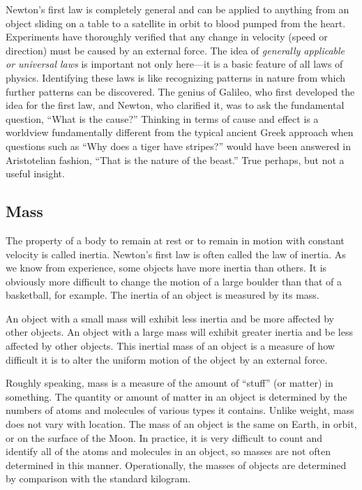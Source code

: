 \documentclass[
]{book}
\begin{document}
Newton's first law is completely general and can be applied to anything
from an object sliding on a table to a satellite in orbit to blood
pumped from the heart. Experiments have thoroughly verified that any
change in velocity (speed or direction) must be caused by an external
force. The idea of \emph{generally applicable or universal laws} is important
not only here---it is a basic feature of all laws of physics.
Identifying these laws is like recognizing patterns in nature from which
further patterns can be discovered. The genius of Galileo, who first
developed the idea for the first law, and Newton, who clarified it, was
to ask the fundamental question, ``What is the cause?'' Thinking in terms
of cause and effect is a worldview fundamentally different from the
typical ancient Greek approach when questions such as ``Why does a tiger
have stripes?'' would have been answered in Aristotelian fashion, ``That
is the nature of the beast.'' True perhaps, but not a useful insight.

\hypertarget{fs-id1737594}{}
\hypertarget{mass}{%
\subsection{Mass}\label{mass}}

The property of a body to remain at rest or to remain in motion with
constant velocity is called \protect\hypertarget{import-auto-id2134480}{}{inertia}. Newton's first law is often called the \protect\hypertarget{import-auto-id1408275}{}{law of
inertia}. As we know from
experience, some objects have more inertia than others. It is obviously
more difficult to change the motion of a large boulder than that of a
basketball, for example. The inertia of an object is measured by its
\protect\hypertarget{import-auto-id1500464}{}{mass}.

An object with a small mass will exhibit less inertia and be more
affected by other objects. An object with a large mass will exhibit
greater inertia and be less affected by other objects. This inertial
mass of an object is a measure of how difficult it is to alter the
uniform motion of the object by an external force.

Roughly speaking, mass is a measure of the amount of ``stuff'' (or matter)
in something. The quantity or amount of matter in an object is
determined by the numbers of atoms and molecules of various types it
contains. Unlike weight, mass does not vary with location. The mass of
an object is the same on Earth, in orbit, or on the surface of the Moon.
In practice, it is very difficult to count and identify all of the atoms
and molecules in an object, so masses are not often determined in this
manner. Operationally, the masses of objects are determined by
comparison with the standard kilogram.
\end{document}
